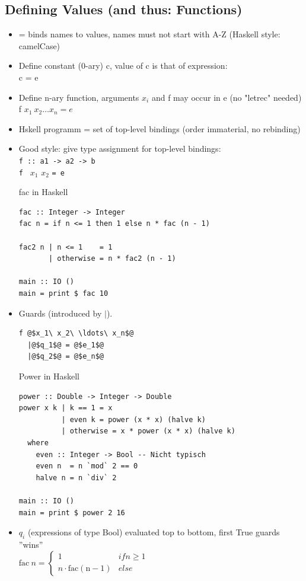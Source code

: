 \documentclass{article}
\newcommand{\Haskell}[1]{\texttt{#1}}
\begin{document}
\subsection{Defining Values (and thus: Functions)}
\begin{itemize}
\item = binds names to values, names must not start with A-Z (Haskell style: camelCase)
\item Define constant (0-ary) c, value of c is that of expression:\\
c = e
\item Define n-ary function, arguments $x_i$ and f may occur in e (no "letrec" needed)\\
f $x_1\ x_2\ldots x_n = e$
\item Hskell programm = set of top-level bindings (order immaterial, no rebinding)
\item Good style: give type assignment for top-level bindings:\\
\Haskell{f :: a1 -> a2 -> b}\\
\Haskell{f } $x_1$ $x_2$ \Haskell{= e}
\begin{listing}[h!]
\caption{fac in Haskell}
\begin{verbatim}
fac :: Integer -> Integer
fac n = if n <= 1 then 1 else n * fac (n - 1)

fac2 n | n <= 1    = 1
       | otherwise = n * fac2 (n - 1)

main :: IO ()
main = print $ fac 10
\end{verbatim}
\end{listing}
\item Guards (introduced by $\vert$).
\begin{verbatim}
f @$x_1\ x_2\ \ldots\ x_n$@
  |@$q_1$@ = @$e_1$@
  |@$q_2$@ = @$e_n$@
\end{verbatim}
\begin{listing}[h!]
\caption{Power in Haskell}
\begin{verbatim}
power :: Double -> Integer -> Double
power x k | k == 1 = x
          | even k = power (x * x) (halve k)
          | otherwise = x * power (x * x) (halve k)
  where
    even :: Integer -> Bool -- Nicht typisch
    even n  = n `mod` 2 == 0
    halve n = n `div` 2

main :: IO ()
main = print $ power 2 16 
\end{verbatim}
\end{listing}
\item $q_i$ (expressions of type Bool) evaluated top to bottom, first True guards ''wins''\\
$\mathrm{fac}\ n = \begin{cases}
1 &if n \geq 1\\
n \cdot \mathrm{fac(n-1)}& else
\end{cases}$\\
\end{itemize}
\end{document}
